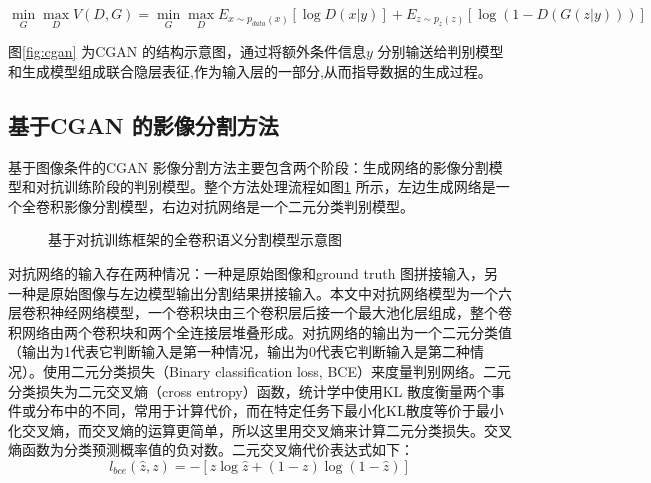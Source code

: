 \begin{equation}
  \label{eq:4-3}
  \mathop{\min}_{G} \mathop{\max}_{D} V(D,G) = \mathop{\min}_{G} \mathop{\max}_{D} E_{x \sim p_{data}(x)} [\log D(x|y)] + E_{z \sim p_{z}(z)}[ \log (1-D(G(z|y)))]
\end{equation}

图\ref{fig:cgan} 为CGAN 的结构示意图，通过将额外条件信息$y$ 分别输送给判别模型和生成模型组成联合隐层表征,作为输入层的一部分,从而指导数据的生成过程。


\subsection{基于CGAN 的影像分割方法}
\label{sec:first-2}
基于图像条件的CGAN 影像分割方法主要包含两个阶段：生成网络的影像分割模型和对抗训练阶段的判别模型。整个方法处理流程如图\ref{fig:gan-fcn} 所示，左边生成网络是一个全卷积影像分割模型，右边对抗网络是一个二元分类判别模型。

\begin{figure}[htb]
  \centering
  \begin{center}
    \caption{基于对抗训练框架的全卷积语义分割模型示意图}\label{fig:gan-fcn}
  \end{center}
\end{figure}

对抗网络的输入存在两种情况：一种是原始图像和ground truth 图拼接输入，另一种是原始图像与左边模型输出分割结果拼接输入。本文中对抗网络模型为一个六层卷积神经网络模型，一个卷积块由三个卷积层后接一个最大池化层组成，整个卷积网络由两个卷积块和两个全连接层堆叠形成。对抗网络的输出为一个二元分类值（输出为1代表它判断输入是第一种情况，输出为0代表它判断输入是第二种情况）。使用二元分类损失（Binary classification loss, BCE）来度量判别网络。二元分类损失为二元交叉熵（cross entropy）函数，统计学中使用KL 散度衡量两个事件或分布中的不同，常用于计算代价，而在特定任务下最小化KL散度等价于最小化交叉熵，而交叉熵的运算更简单\cite{de2005tutorial}，所以这里用交叉熵来计算二元分类损失。交叉熵函数为分类预测概率值的负对数。二元交叉熵代价表达式如下：
\begin{equation}
  \label{eq:4-4}
  l_{bce} (\hat{z}, z) = -[z\log\hat{z} + (1-z)\log(1-\hat{z})]
\end{equation}

